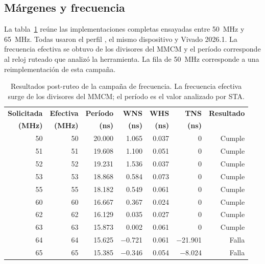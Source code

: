 \subsection{Márgenes y frecuencia}

La tabla~\ref{tab:frecuencia-resultados} reúne las implementaciones completas
ensayadas entre \SI{50}{\mega\hertz} y \SI{65}{\mega\hertz}. Todas usaron el
perfil , el mismo dispositivo y Vivado 2026.1. La frecuencia
efectiva se obtuvo de los divisores del MMCM y el período corresponde al reloj
ruteado que analizó la herramienta. La fila de \SI{50}{\mega\hertz} corresponde
a una reimplementación de esta campaña.

\begin{table}[H]
  \centering
  \small
  \setlength{\tabcolsep}{3.5pt}
  \begin{tabular}{rrrrrrr}
    \toprule
    \textbf{Solicitada} & \textbf{Efectiva} & \textbf{Período} &
    \textbf{WNS} & \textbf{WHS} & \textbf{TNS} & \textbf{Resultado} \\
    \textbf{(MHz)} & \textbf{(MHz)} & \textbf{(ns)} & \textbf{(ns)} &
    \textbf{(ns)} & \textbf{(ns)} & \\
    \midrule
    50 & 50 & \num{20.000} & \num[explicit-sign=+]{1.065} &
    \num[explicit-sign=+]{0.037} & 0 & Cumple \\
    51 & 51 & \num{19.608} & \num[explicit-sign=+]{1.100} &
    \num[explicit-sign=+]{0.051} & 0 & Cumple \\
    52 & 52 & \num{19.231} & \num[explicit-sign=+]{1.536} &
    \num[explicit-sign=+]{0.037} & 0 & Cumple \\
    53 & 53 & \num{18.868} & \num[explicit-sign=+]{0.584} &
    \num[explicit-sign=+]{0.073} & 0 & Cumple \\
    55 & 55 & \num{18.182} & \num[explicit-sign=+]{0.549} &
    \num[explicit-sign=+]{0.061} & 0 & Cumple \\
    60 & 60 & \num{16.667} & \num[explicit-sign=+]{0.367} &
    \num[explicit-sign=+]{0.024} & 0 & Cumple \\
    62 & 62 & \num{16.129} & \num[explicit-sign=+]{0.035} &
    \num[explicit-sign=+]{0.027} & 0 & Cumple \\
    63 & 63 & \num{15.873} & \num[explicit-sign=+]{0.002} &
    \num[explicit-sign=+]{0.061} & 0 & Cumple \\
    64 & 64 & \num{15.625} & \num{-0.721} &
    \num[explicit-sign=+]{0.061} & \num{-21.901} & Falla \\
    65 & 65 & \num{15.385} & \num{-0.346} &
    \num[explicit-sign=+]{0.054} & \num{-8.024} & Falla \\
    \bottomrule
  \end{tabular}
  \caption{Resultados post-ruteo de la campaña de frecuencia. La frecuencia
  efectiva surge de los divisores del MMCM; el período es el valor analizado
  por STA.}
  \label{tab:frecuencia-resultados}
\end{table}

